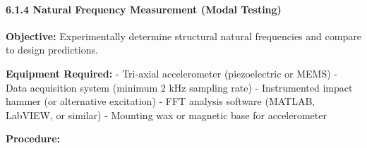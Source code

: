 \documentclass[
]{article}
\begin{document}
\paragraph{6.1.4 Natural Frequency Measurement (Modal
Testing)}\label{natural-frequency-measurement-modal-testing}

\textbf{Objective:} Experimentally determine structural natural
frequencies and compare to design predictions.

\textbf{Equipment Required:} - Tri-axial accelerometer (piezoelectric or
MEMS) - Data acquisition system (minimum 2 kHz sampling rate) -
Instrumented impact hammer (or alternative excitation) - FFT analysis
software (MATLAB, LabVIEW, or similar) - Mounting wax or magnetic base
for accelerometer

\textbf{Procedure:}
\end{document}
